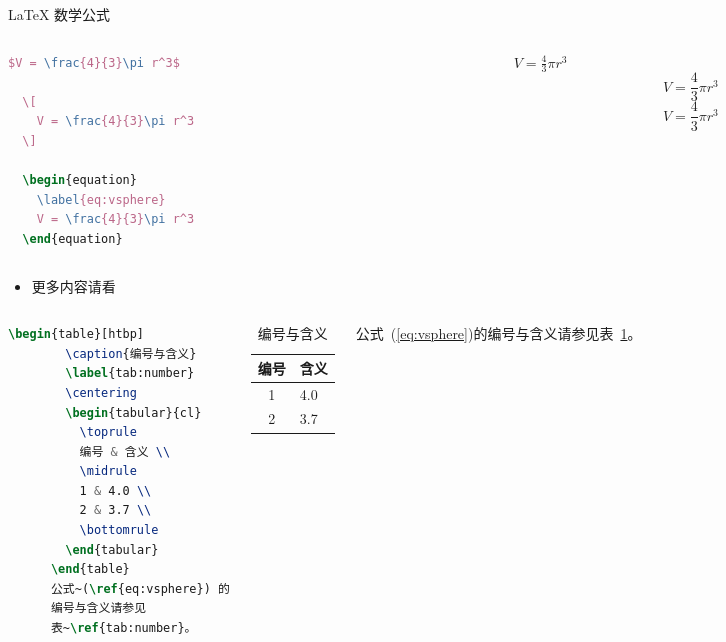 \documentclass[UTF8, fontset=fandol]{beamer}
\begin{document}
  \begin{frame}[fragile]{\LaTeX{} 数学公式}
    \begin{columns}
      \begin{column}{.55\textwidth}
  \begin{lstlisting}[language=TeX]
  $V = \frac{4}{3}\pi r^3$

  \[
    V = \frac{4}{3}\pi r^3
  \]

  \begin{equation}
    \label{eq:vsphere}
    V = \frac{4}{3}\pi r^3
  \end{equation}
  \end{lstlisting}
      \end{column}

      \begin{column}{.4\textwidth}
        $V = \frac{4}{3}\pi r^3$
        \[
          V = \frac{4}{3}\pi r^3
        \]
        \begin{equation}
          \label{eq:vsphere}
          V = \frac{4}{3}\pi r^3
        \end{equation}
      \end{column}
    \end{columns}
    \begin{itemize}
      \item 更多内容请看 \href{https://zh.wikipedia.org/wiki/Help:数学公式}{\color{red}{这里}}
    \end{itemize}
  \end{frame}

  \begin{frame}[fragile]
    \begin{columns}
      \begin{lstlisting}[language=TeX]
      \begin{table}[htbp]
        \caption{编号与含义}
        \label{tab:number}
        \centering
        \begin{tabular}{cl}
          \toprule
          编号 & 含义 \\
          \midrule
          1 & 4.0 \\
          2 & 3.7 \\
          \bottomrule
        \end{tabular}
      \end{table}
      公式~(\ref{eq:vsphere}) 的
      编号与含义请参见
      表~\ref{tab:number}。
      \end{lstlisting}
      \begin{table}[htpb]
        \centering
        \caption{编号与含义}
        \label{tab:number}
        \begin{tabular}{cl}\toprule
          编号 & 含义 \\\midrule
          1 & 4.0\\
          2 & 3.7\\\bottomrule
        \end{tabular}
      \end{table}
      \normalsize 公式~(\ref{eq:vsphere})的编号与含义请参见表~\ref{tab:number}。
    \end{columns}
  \end{frame}
\end{document}
